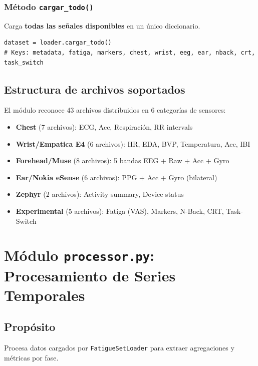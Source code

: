 \documentclass[12pt,a4paper]{article}
\begin{document}
\subsubsection{Método \texttt{cargar\_todo()}}

Carga \textbf{todas las señales disponibles} en un único diccionario.

\begin{lstlisting}
dataset = loader.cargar_todo()
# Keys: metadata, fatiga, markers, chest, wrist, eeg, ear, nback, crt, task_switch
\end{lstlisting}

\subsection{Estructura de archivos soportados}

El módulo reconoce 43 archivos distribuidos en 6 categorías de sensores:

\begin{itemize}
    \item \textbf{Chest} (7 archivos): ECG, Acc, Respiración, RR intervals
    \item \textbf{Wrist/Empatica E4} (6 archivos): HR, EDA, BVP, Temperatura, Acc, IBI
    \item \textbf{Forehead/Muse} (8 archivos): 5 bandas EEG + Raw + Acc + Gyro
    \item \textbf{Ear/Nokia eSense} (6 archivos): PPG + Acc + Gyro (bilateral)
    \item \textbf{Zephyr} (2 archivos): Activity summary, Device status
    \item \textbf{Experimental} (5 archivos): Fatiga (VAS), Markers, N-Back, CRT, Task-Switch
\end{itemize}

\section{Módulo \texttt{processor.py}: Procesamiento de Series Temporales}

\subsection{Propósito}

Procesa datos cargados por \texttt{FatigueSetLoader} para extraer agregaciones y métricas por fase.
\end{document}
